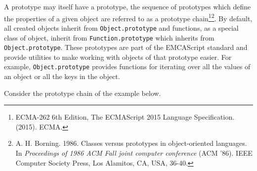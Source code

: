 \documentclass[]{article}
\begin{document}
A prototype may itself have a prototype, the sequence of prototypes
which define the properties of a given object are referred to as a
prototype chain\footnote{ECMA-262 6th Edition, The ECMAScript 2015
  Language Specification. (2015). ECMA.}\footnote{A. H. Borning. 1986.
  Classes versus prototypes in object-oriented languages. In
  \emph{Proceedings of 1986 ACM Fall joint computer conference} (ACM
  '86). IEEE Computer Society Press, Los Alamitos, CA, USA, 36-40.}. By
default, all created objects inherit from \texttt{Object.prototype} and
functions, as a special class of object, inherit from
\texttt{Function.prototype} which inherits from
\texttt{Object.prototype}. These prototypes are part of the EMCAScript
standard and provide utilities to make working with objects of that
prototype easier. For example, \texttt{Object.prototype} provides
functions for iterating over all the values of an object or all the keys
in the object.

Consider the prototype chain of the example below.
\end{document}
